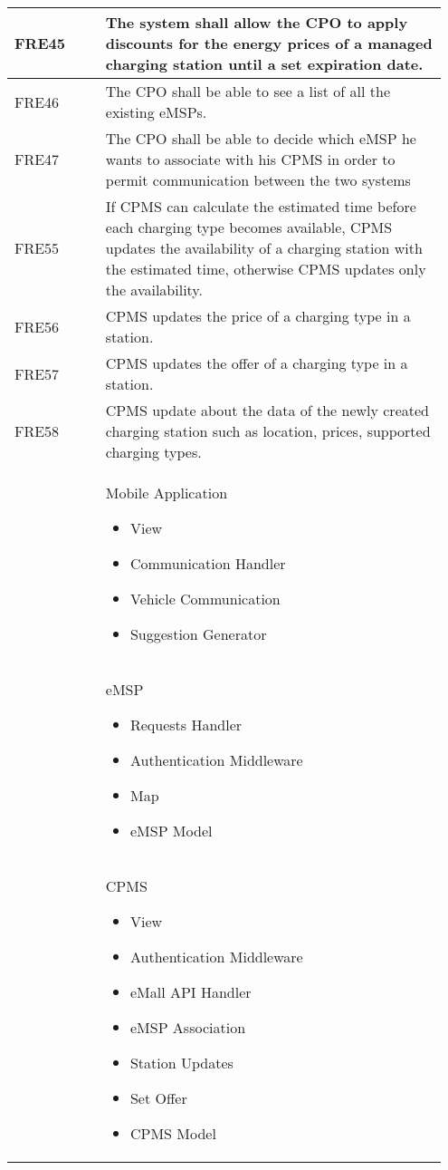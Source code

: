 {\begin{longtable}{|p{0.20\linewidth}p{0.75\linewidth} |}
    \hline
    \rowcolor{bluepoli!15} FRE45 &The system shall allow the CPO to apply discounts for the energy prices of a managed charging station until a set expiration date.\\
    \hline
    \rowcolor{bluepoli!15}
    FRE46 & The CPO shall be able to see a list of all the existing eMSPs. \\
    \hline
    \rowcolor{bluepoli!15} FRE47 &  The CPO shall be able to decide which eMSP he wants to associate with his CPMS in order to permit communication between the two systems \\
    \hline
    \rowcolor{bluepoli!15} FRE55 & If CPMS can calculate the estimated time before each charging type becomes available, CPMS updates the availability of a charging station with the estimated time, otherwise CPMS updates only the availability. \\
    \hline
    \rowcolor{bluepoli!15} FRE56 & CPMS updates the price of a charging type in a station. \\
    \hline  
    \rowcolor{bluepoli!15} FRE57 & CPMS updates the offer of a charging type in a station. \\
    \hline  
     \rowcolor{bluepoli!15}
     FRE58 & CPMS update about the data of the newly created charging station such as location, prices, supported charging types.\\
     \hline
    \rowcolor{bluepoli!5}  & Mobile Application  \newline
    \begin{itemize}
        \item View
        \item Communication Handler
        \item Vehicle Communication
        \item Suggestion Generator 
    \end{itemize} \\
    \hline
    \rowcolor{bluepoli!5}  & eMSP  \newline
    \begin{itemize}
        \item Requests Handler
        \item Authentication Middleware
        \item Map
        \item eMSP Model
    \end{itemize} \\
    \hline
    \rowcolor{bluepoli!5}  & CPMS  \newline
    \begin{itemize}
        \item View
        \item Authentication Middleware
        \item eMall API Handler
        \item eMSP Association
        \item Station Updates
        \item Set Offer
        \item CPMS Model
    \end{itemize} \\
    \hline
\end{longtable}}
